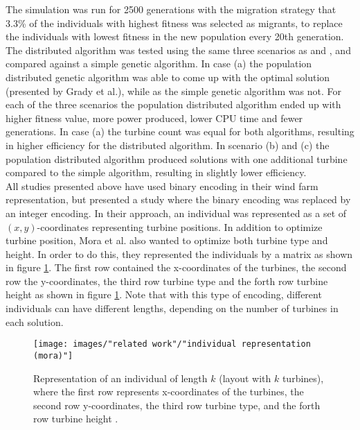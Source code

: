 \noindent The simulation was run for 2500 generations with the migration strategy that 3.3\% of the individuals with highest fitness was selected as migrants, to replace the individuals with lowest fitness in the new population every 20th generation. The distributed algorithm was tested using the same three scenarios as \cite{Mosetti} and \cite{Grady}, and compared against a simple genetic algorithm. In case (a) the population distributed genetic algorithm was able to come up with the optimal solution (presented by Grady et al.), while as the simple genetic algorithm was not. For each of the three scenarios the population distributed algorithm ended up with higher fitness value, more power produced, lower CPU time and fewer generations. In case (a) the turbine count was equal for both algorithms, resulting in higher efficiency for the distributed algorithm. In scenario (b) and (c) the population distributed algorithm produced solutions with one additional turbine compared to the simple algorithm, resulting in slightly lower efficiency. \\


\noindent All studies presented above have used binary encoding in their wind farm representation, but \cite{Mora} presented a study where the binary encoding was replaced by an integer encoding. In their approach, an individual was represented as a set of $(x, y)$-coordinates representing turbine positions. In addition to optimize turbine position, Mora et al. also wanted to optimize both turbine type and height. In order to do this, they represented the individuals by a matrix as shown in figure \ref{Individual Representation (Mora)}. The first row contained the x-coordinates of the turbines, the second row the y-coordinates, the third row turbine type and the forth row turbine height as shown in figure \ref{Individual Representation (Mora)}. Note that with this type of encoding, different individuals can have different lengths, depending on the number of turbines in each solution.\\


\begin{figure}[h!]
\begin{center}
\texttt{[image: images/"related work"/"individual representation (mora)"]}
\caption{Representation of an individual of length $k$ (layout with $k$ turbines), where the first row represents x-coordinates of the turbines, the second row y-coordinates, the third row turbine type, and the forth row turbine height \citep{Mora}.}
\label{Individual Representation (Mora)}
\end{center}
\end{figure}


